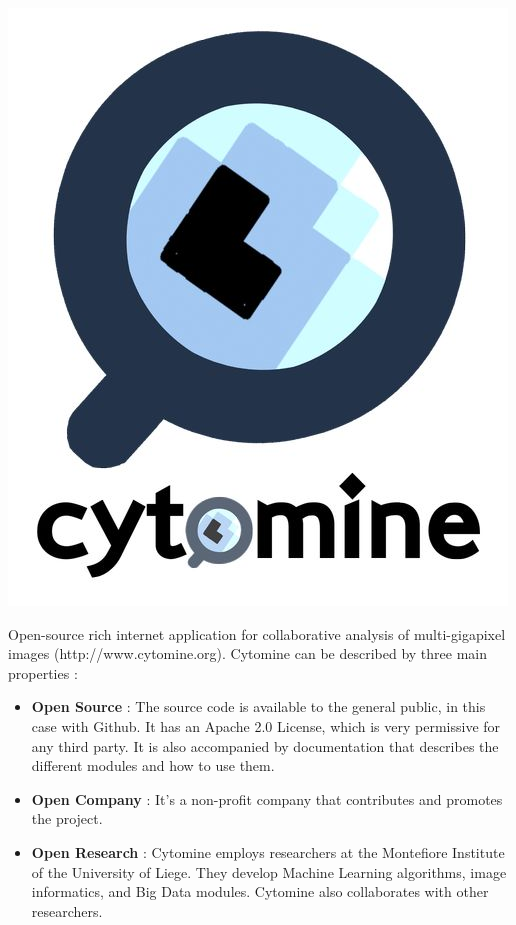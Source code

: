 \documentclass[a4paper,11pt]{report}
\numberwithin{figure}{chapter} %
\begin{document}
\begin{center}
    \includegraphics[scale=0.80]{images/logo_cytomine.jpg}
\end{center}

Open-source rich internet application for collaborative analysis of multi-gigapixel images (http://www.cytomine.org).
Cytomine can be described by three main properties :
\begin{itemize}
\item[\textbullet] \textbf{Open Source} : The source code is available to the general public, in this case with Github.
It has an Apache 2.0 License, which is very permissive for any third party.
It is also accompanied by documentation that describes the different modules and how to use them.
\item[\textbullet] \textbf{Open Company} : It's a non-profit company that contributes and promotes the project.
\item[\textbullet] \textbf{Open Research} : Cytomine employs researchers at the Montefiore Institute of the University of Liege.
They develop Machine Learning algorithms, image informatics, and Big Data modules.
Cytomine also collaborates with other researchers.
\end{itemize}
\end{document}
